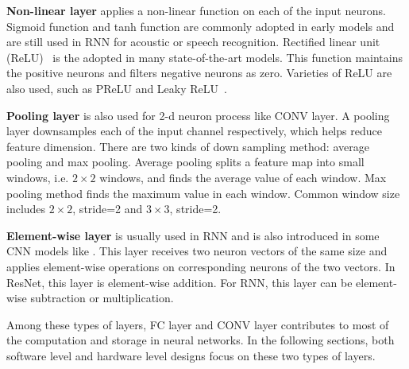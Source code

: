 {\bf{Non-linear layer}} applies a non-linear function on each of the input neurons. Sigmoid function and tanh function are commonly adopted in early models and are still used in RNN for acoustic or speech recognition. Rectified linear unit (ReLU)~\cite{krizhevsky2012imagenet} is the adopted in many state-of-the-art models. This function maintains the positive neurons and filters negative neurons as zero. Varieties of ReLU are also used, such as PReLU and Leaky ReLU~\cite{xu2015empirical}.

{\bf{Pooling layer}} is also used for 2-d neuron process like CONV layer. A pooling layer downsamples each of the input channel respectively, which helps reduce feature dimension. There are two kinds of down sampling method: average pooling and max pooling. Average pooling splits a feature map into small windows, i.e. $2\times2$ windows, and finds the average value of each window. Max pooling method finds the maximum value in each window. Common window size includes $2\times2$, stride=2 and $3\times3$, stride=2.

{\bf{Element-wise layer}} is usually used in RNN and is also introduced in some CNN models like \cite{he2016deep}. This layer receives two neuron vectors of the same size and applies element-wise operations on corresponding neurons of the two vectors. In ResNet, this layer is element-wise addition. For RNN, this layer can be element-wise subtraction or multiplication.

Among these types of layers, FC layer and CONV layer contributes to most of the computation and storage in neural networks. In the following sections, both software level and hardware level designs focus on these two types of layers.